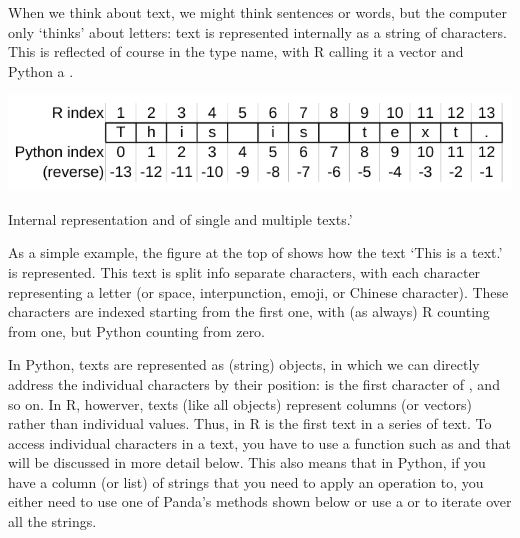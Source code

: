 
When we think about text, we might think sentences or words, but the computer only `thinks' about letters:
text is represented internally as a string of characters.
This is reflected of course in the type name, with R calling it a  vector and Python a .

\begin{ccsexample}
  \begin{center} \includegraphics[width=.6\textwidth]{chapter10/text.pdf}\end{center}
  

  \caption{Internal representation and of single and multiple texts.'}\label{ex:text}
\end{ccsexample}

As a simple example, the figure at the top of  shows how the text `This is a text.' is represented.
This text is split info separate characters, with each character representing a letter (or space, interpunction, emoji, or Chinese character).
These characters are indexed starting from the first one, with (as always) R counting from one, but Python counting from zero.

In Python, texts are represented as  (string) objects, in which we can directly address the individual characters by their position:  is the first character of , and so on.
In R, howerver, texts (like all objects) represent columns (or vectors) rather than individual values.
Thus,  in R is the first text in a series of text.
To access individual characters in a text, you have to use a function such as  and  that will be discussed in more detail below. 
This also means that in Python, if you have a column (or list) of strings that you need to apply an operation to,
you either need to use one of Panda's methods shown below or use a  or  to iterate over all the strings.

